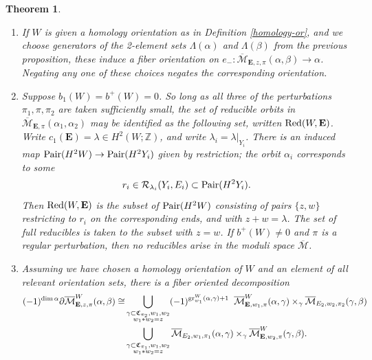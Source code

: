 \documentclass[10pt,a4paper]{amsart}
\newtheorem{theorem}{Theorem}
\theoremstyle{definition}
\theoremstyle{remark}
\numberwithin{figure}{qchap}
\begin{document}
\begin{theorem}
\begin{enumerate}
\item If $W$ is given a homology orientation as in Definition \ref{homology-or}, and we choose generators of the 2-element sets $\Lambda(\alpha)$ and $\Lambda(\beta)$ from the previous proposition, these induce a fiber orientation on $e_-: \overline{\mathcal M}_{\mathbf{E},z,\pi}(\alpha, \beta)\to \alpha$. Negating any one of these choices negates the corresponding orientation.\\
\item Suppose $b_1(W) = b^+(W) = 0$. So long as all three of the perturbations $\pi_1, \pi, \pi_2$ are taken sufficiently small, the set of reducible orbits in $\overline{\mathcal M}_{\mathbf{E},\pi}(\alpha_1, \alpha_2)$ may be identified as the following set, written $\textup{Red}(W,\mathbf{E})$. Write $c_1(\mathbf{E}) = \lambda \in H^2(W;\mathbb Z)$, and write $\lambda_i = \lambda\big|_{Y_i}$. There is an induced map $\textup{Pair}(H^2 W) \to \textup{Pair}(H^2 Y_i)$ given by restriction; the orbit $\alpha_i$ corresponds to some $$r_i \in \mathcal R_{\lambda_i}(Y_i, E_i) \subset \textup{Pair}(H^2 Y_i).$$ Then $\textup{Red}(W, \mathbf{E})$ is the subset of $\textup{Pair}(H^2 W)$ consisting of pairs $\{z, w\}$ restricting to $r_i$ on the corresponding ends, and with $z+w = \lambda$. The set of full reducibles is taken to the subset with $z = w$. If $b^+(W) \neq 0$ and $\pi$ is a regular perturbation, then no reducibles arise in the moduli space $\overline{\mathcal M}$.\\
\item Assuming we have chosen a homology orientation of $W$ and an element of all relevant orientation sets, there is a fiber oriented decomposition \begin{align*}(-1)^{\dim \alpha}\partial \overline{\mathcal M}^W_{\mathbf{E},z,\pi}(\alpha, \beta) \cong &\bigcup_{\substack{\gamma \subset \mathfrak C_{\pi_2}, w_1, w_2 \\ w_1 \ast w_2 = z}} (-1)^{\textup{gr}^W_{w_1}(\alpha, \gamma)+1}\;\; \overline{\mathcal M}^W_{\mathbf{E},w_1,\pi}(\alpha, \gamma) \times_\gamma \overline{\mathcal M}_{E_2,w_2,\pi_2}(\gamma, \beta)\\ &\bigcup_{\substack{\gamma \subset \mathfrak C_{\pi_1}, w_1, w_2 \\ w_1 \ast w_2 = z}} \overline{\mathcal M}_{E_2,w_1,\pi_1}(\alpha, \gamma) \times_\gamma \overline{\mathcal M}^W_{\mathbf{E},w_2,\pi}(\gamma, \beta).\end{align*}
\end{enumerate}
\end{theorem}
\end{document}
